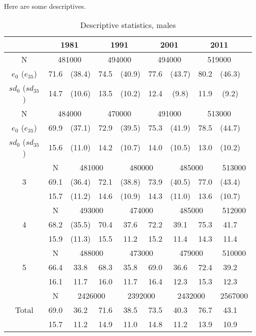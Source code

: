 \documentclass[12pt,oneside,a4paper]{article} %
\theoremstyle{definition}
\begin{document}
Here are some descriptives.
\begin{table}[ht]
\caption{Descriptive statistics, males}
\centering
\begin{tabular}{cccccccccc}
  \hline
 & \multicolumn{2}{c}{1981} & \multicolumn{2}{c}{1991}   &
 \multicolumn{2}{c}{2001} &   \multicolumn{2}{c}{2011} &  \\
  \hline
N & \multicolumn{2}{c}{481000} & \multicolumn{2}{c}{494000} &
\multicolumn{2}{c}{494000}  & \multicolumn{2}{c}{519000}   \\
  $e_0$ ($e_{35}$) & 71.6 & (38.4) & 74.5 & (40.9) & 77.6 & (43.7) & 80.2 &
  (46.3)
  \\
   $sd_0$ ($sd_{35}$) & 14.7 & (10.6) & 13.5 & (10.2) & 12.4 & (9.8) & 11.9
   & (9.2) \\
  \hline
N & \multicolumn{2}{c}{484000}   & \multicolumn{2}{c}{470000}  &
\multicolumn{2}{c}{491000}  & \multicolumn{2}{c}{513000}   \\
  $e_0$ ($e_{35}$) & 69.9 & (37.1) & 72.9 & (39.5) & 75.3 & (41.9) & 78.5 &
  (44.7)
  \\
  $sd_0$ ($sd_{35}$) & 15.6 & (11.0) & 14.2 & (10.7) & 14.0 & (10.5) & 13.0 &
  (10.2)
  \\
   \hline
  \multirow{ 3}{*}{3} &   N & \multicolumn{2}{c}{481000}   &
     \multicolumn{2}{c}{480000}  & \multicolumn{2}{c}{485000}  & \multicolumn{2}{c}{513000}   \\
  $e_0$ ($e_{35}$) & 69.1 & (36.4) & 72.1 & (38.8) & 73.9 & (40.5) & 77.0 &
  (43.4)
  \\
  $sd_0$ ($sd_{35}$) & 15.7 & (11.2) & 14.6 & (10.9) & 14.3 & (11.0) & 13.6 &
  (10.7)
  \\
   \hline
 \multirow{ 3}{*}{4} &  N & \multicolumn{2}{c}{493000}   &
   \multicolumn{2}{c}{474000}  & \multicolumn{2}{c}{485000}  & \multicolumn{2}{c}{512000}   \\
  $e_0$ ($e_{35}$) & 68.2 & (35.5) & 70.4 & 37.6 & 72.2 & 39.1 & 75.3 & 41.7 \\ 
  $sd_0$ ($sd_{35}$) & 15.9 & (11.3) & 15.5 & 11.2 & 15.2 & 11.4 & 14.3 & 11.4
  \\
   \hline
\multirow{ 3}{*}{5} &  N & \multicolumn{2}{c}{488000}   &
  \multicolumn{2}{c}{473000}  & \multicolumn{2}{c}{479000}  & \multicolumn{2}{c}{510000}   \\
  $e_0$ ($e_{35}$) & 66.4 & 33.8 & 68.3 & 35.8 & 69.0 & 36.6 & 72.4 & 39.2 \\ 
  $sd_0$ ($sd_{35}$) & 16.1 & 11.7 & 16.0 & 11.7 & 16.4 & 12.3 & 15.3 & 12.3 \\ 
   \hline
 \multirow{ 3}{*}{Total} & N & \multicolumn{2}{c}{2426000}   &
  \multicolumn{2}{c}{2392000}  & \multicolumn{2}{c}{2432000}  & \multicolumn{2}{c}{2567000}   \\
  17 & 69.0 & 36.2 & 71.6 & 38.5 & 73.5 & 40.3 & 76.7 & 43.1 \\ 
  18 & 15.7 & 11.2 & 14.9 & 11.0 & 14.8 & 11.2 & 13.9 & 10.9 \\ 
   \hline
\end{tabular}
\end{table}
\end{document}
